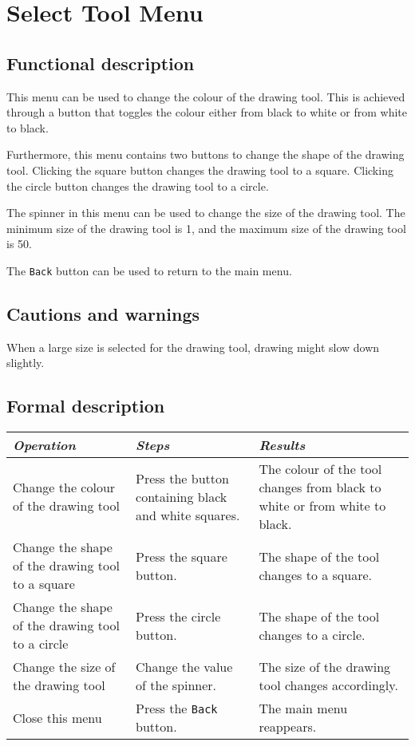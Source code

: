 \section{Select Tool Menu}\label{sec:selecttoolmenu}
  \subsection*{Functional description}
  This menu can be used to change the colour of the drawing tool. This is achieved through a button that toggles the colour either from black to white or from white to black.
  
  Furthermore, this menu contains two buttons to change the shape of the drawing tool. Clicking the square button changes the drawing tool to a square. Clicking the circle button changes the drawing tool to a circle.
  
  The spinner in this menu can be used to change the size of the drawing tool. The minimum size of the drawing tool is 1, and the maximum size of the drawing tool is 50.
  
  The \texttt{Back} button can be used to return to the main menu.

  \subsection*{Cautions and warnings}
  When a large size is selected for the drawing tool, drawing might slow down slightly.

  \subsection*{Formal description}
  \begin{tabularx}{\textwidth}{XXX}
    \toprule
    \emph{Operation} & \emph{Steps} & \emph{Results} \\
    \midrule
    Change the colour of the drawing tool & Press the button containing black and white squares. & The colour of the tool changes from black to white or from white to black. \\
    \midrule
    Change the shape of the drawing tool to a square & Press the square button. & The shape of the tool changes to a square. \\
    \midrule
    Change the shape of the drawing tool to a circle & Press the circle button. & The shape of the tool changes to a circle. \\
    \midrule
    Change the size of the drawing tool & Change the value of the spinner. & The size of the drawing tool changes accordingly. \\ 
    \midrule
    Close this menu & Press the \texttt{Back} button. & The main menu reappears. \\
    \bottomrule
  \end{tabularx}

